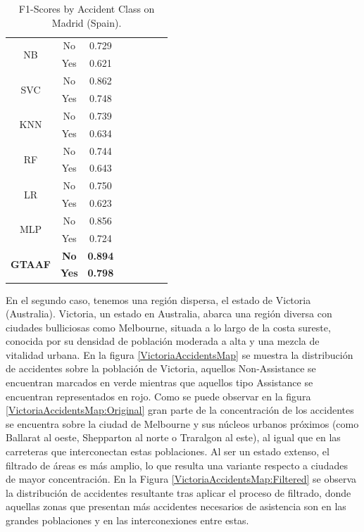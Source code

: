 \documentclass{uathesis-es}
\begin{document}
{\begin{table}[H]
\begin{center}
\begin{tabular}{|c|c||c|c|c|c|c|c|}
				\multirow{2}{*}{NB} &
				No &  0.729 \\ &
				Yes & 0.621 \\ \hline \hline
				\multirow{2}{*}{SVC} &
				No & 0.862 \\ &
				Yes &  0.748 \\ \hline \hline
				\multirow{2}{*}{KNN} &
				No  & 0.739 \\ &
				Yes & 0.634 \\ \hline \hline
				\multirow{2}{*}{RF} &
				No & 0.744 \\ &
				Yes & 0.643  \\ \hline \hline
				\multirow{2}{*}{LR} &
				No &  0.750 \\ &
				Yes & 0.623 \\ \hline \hline
				\multirow{2}{*}{MLP} &
				No & 0.856 \\ &
				Yes & 0.724  \\ \hline \hline
				\multirow{2}{*}{\textbf{GTAAF}} &
				\textbf{No} & \textbf{0.894} \\ &
				\textbf{Yes} & \textbf{0.798} \\ \hline \hline
			\end{tabular}
		\end{center}
		\caption{F1-Scores by Accident Class on Madrid (Spain).}
		\label{SpainMetrics}
	\end{table}
	
	En el segundo caso, tenemos una región dispersa, el estado de Victoria (Australia). Victoria, un estado en Australia, abarca una región diversa con ciudades bulliciosas como Melbourne, situada a lo largo de la costa sureste, conocida por su densidad de población moderada a alta y una mezcla de vitalidad urbana. En la figura \ref{VictoriaAccidentsMap} se muestra la distribución de accidentes sobre la población de Victoria, aquellos Non-Assistance se encuentran marcados en verde mientras que aquellos tipo Assistance se encuentran representados en rojo. Como se puede observar en la figura \ref{VictoriaAccidentsMap:Original} gran parte de la concentración de los accidentes se encuentra sobre la ciudad de Melbourne y sus núcleos urbanos próximos (como Ballarat al oeste, Shepparton al norte o Traralgon al este), al igual que en las carreteras que interconectan estas poblaciones. Al ser un estado extenso, el filtrado de áreas es más amplio, lo que resulta una variante respecto a ciudades de mayor concentración. En la Figura \ref{VictoriaAccidentsMap:Filtered} se observa la distribución de accidentes resultante tras aplicar el proceso de filtrado, donde aquellas zonas que presentan más accidentes necesarios de asistencia son en las grandes poblaciones y en las interconexiones entre estas.
	
}
\end{document}
